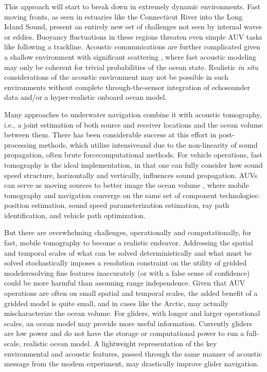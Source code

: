 This approach will start to break down in extremely dynamic environments.
Fast moving fronts, as seen in estuaries like the Connecticut River into the Long Island Sound, present an entirely new set of challenges not seen by internal waves or eddies.
Buoyancy fluctuations in these regions threaten even simple AUV tasks like following a trackline.
Acoustic communications are further complicated given a shallow environment with significant scattering \citep{lavery_measurements_2010,ross_acoustic_2012,lavery_broadband_2013}, where fast acoustic modeling may only be coherent for trivial probabilities of the ocean state.
Realistic \textit{in situ} considerations of the acoustic environment may not be possible in such environments without complete through-the-sensor integration of echosounder data and/or a hyper-realistic onboard ocean model.

 Many approaches to underwater navigation combine it with acoustic tomography, i.e., a joint estimation of both source and receiver locations and the ocean volume between them.
There has been considerable success at this effort in post-processing methods, which utilize intensive\textemdash and due to the non-linearity of sound propagation, often brute force\textemdash computational methods. 
For vehicle operations, fast tomography is the ideal implementation, in that one can fully consider how sound speed structure, horizontally and vertically, influences sound propagation.
AUVs can serve as moving sources to better image the ocean volume \citep{deffenbaugh_optimal_1997,elisseeff_ocean_2002}, where mobile tomography and navigation converge on the same set of component technologies: position estimation, sound speed parameterization estimation, ray path identification, and vehicle path optimization.

But there are overwhelming challenges, operationally and computationally, for fast, mobile tomography to become a realistic endeavor.
Addressing the spatial and temporal scales of what can be solved deterministically and what must be solved stochastically imposes a resolution constraint on the utility of gridded models\textemdash resolving fine features inaccurately (or with a false sense of confidence) could be more harmful than assuming range independence.
Given that AUV operations are often on small spatial and temporal scales, the added benefit of a gridded model is quite small, and in cases like the Arctic, may actually mischaracterize the ocean volume. 
For gliders, with longer and larger operational scales, an ocean model may provide more useful information.
Currently gliders are low power and do not have the storage or computational power to run a full-scale, realistic ocean model.
A lightweight representation of the key environmental and acoustic features, passed through the same manner of acoustic message from the modem experiment, may drastically improve glider navigation.

